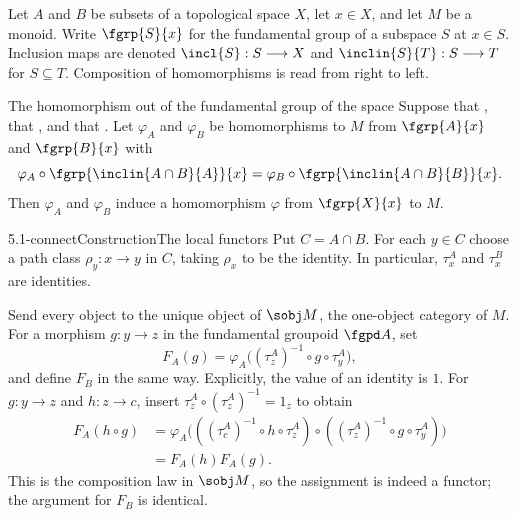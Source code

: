 Let $A$ and $B$ be subsets of a topological space $X$, let $x\in X$, and let
$M$ be a monoid.  Write $\fgrp{S}{x}$ for the fundamental group of a subspace
$S$ at $x\in S$.  Inclusion maps are denoted $\incl{S}:S\longrightarrow X$
and $\inclin{S}{T}:S\longrightarrow T$ for $S\subseteq T$.  Composition of
homomorphisms  is read from right to left.

\begin{definition}[id=5.1]{The homomorphism out of the fundamental group of the space}
Suppose that \hypCoverTwo, that \hypPathConnected, and that \hypBasepoint.  Let
$\varphi_{A}$ and $\varphi_{B}$ be homomorphisms to $M$ from $\fgrp{A}{x}$ and
$\fgrp{B}{x}$ with
\[
  \varphi_{A} \circ \fgrp{\inclin{A \cap B}{A}}{x}
    = \varphi_{B} \circ \fgrp{\inclin{A \cap B}{B}}{x}.
\]
Then $\varphi_{A}$ and $\varphi_{B}$ induce a homomorphism $\varphi$ from
$\fgrp{X}{x}$ to $M$.
\end{definition}

\begin{proofpassage}{5.1-connect}{Construction}{The local functors}
Put $C=A\cap B$.  For each $y\in C$ choose a path class
$\rho_y:x\longrightarrow y$ in $C$, taking $\rho_x$ to be the identity.
  In particular, $\tau^A_x$ and $\tau^B_x$ are identities.

Send every object to the unique object of $\sobj M$, the one-object category
of $M$.  For a morphism
$g:y\longrightarrow z$ in the fundamental groupoid $\fgpd A$, set
\[
 F_A(g)=\varphi_A\bigl((\tau^A_z)^{-1}\circ g\circ\tau^A_y\bigr),
\]
and define $F_B$ in the same way.    Explicitly, the value of an identity is $1$.  For
$g:y\longrightarrow z$ and $h:z\longrightarrow c$, insert
$\tau^A_z\circ(\tau^A_z)^{-1}=1_z$ to obtain
\[
\begin{aligned}
 F_A(h\circ g)
 &=\varphi_A\bigl(((\tau^A_c)^{-1}\circ h\circ\tau^A_z)
            \circ((\tau^A_z)^{-1}\circ g\circ\tau^A_y)\bigr)\\
 &=F_A(h)F_A(g).
\end{aligned}
\]
This is the composition law in $\sobj M$, so the assignment is indeed a
functor; the argument for $F_B$ is identical.
\end{proofpassage}

